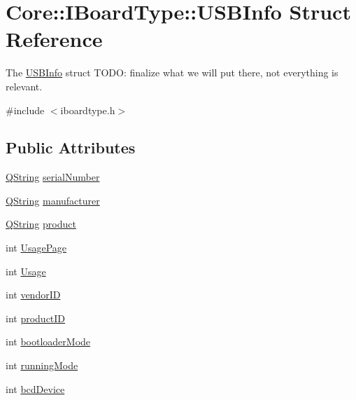 \hypertarget{struct_core_1_1_i_board_type_1_1_u_s_b_info}{\section{\-Core\-:\-:\-I\-Board\-Type\-:\-:\-U\-S\-B\-Info \-Struct \-Reference}
\label{struct_core_1_1_i_board_type_1_1_u_s_b_info}
}


\-The \hyperlink{struct_core_1_1_i_board_type_1_1_u_s_b_info}{\-U\-S\-B\-Info} struct \-T\-O\-D\-O\-: finalize what we will put there, not everything is relevant.  




{\ttfamily \#include $<$iboardtype.\-h$>$}

\subsection*{\-Public \-Attributes}
\begin{DoxyCompactItemize}
\item 
\hyperlink{group___u_a_v_objects_plugin_gab9d252f49c333c94a72f97ce3105a32d}{\-Q\-String} \hyperlink{group___core_plugin_ga895802cf9e1054b0fbffdc0fc3ff9f30}{serial\-Number}
\item 
\hyperlink{group___u_a_v_objects_plugin_gab9d252f49c333c94a72f97ce3105a32d}{\-Q\-String} \hyperlink{group___core_plugin_gab425397b209f59d9c9cb215481f4e018}{manufacturer}
\item 
\hyperlink{group___u_a_v_objects_plugin_gab9d252f49c333c94a72f97ce3105a32d}{\-Q\-String} \hyperlink{group___core_plugin_ga5e622955d0d8c0244266ab1702000d92}{product}
\item 
int \hyperlink{group___core_plugin_gabcd3cddf005c60e8f45ea04eaa929ae3}{\-Usage\-Page}
\item 
int \hyperlink{group___core_plugin_gae9b3ee9d3f84e2dc3c25cb6f90a248ad}{\-Usage}
\item 
int \hyperlink{group___core_plugin_gaa22fe6fa3154cfff62d3e1860c8b7f7b}{vendor\-I\-D}
\item 
int \hyperlink{group___core_plugin_ga454be60cf2bba54712173af606a748b8}{product\-I\-D}
\item 
int \hyperlink{group___core_plugin_ga18f0e8647d887f9f5e37b406c5bd6976}{bootloader\-Mode}
\item 
int \hyperlink{group___core_plugin_ga8e598df3f5e0f673451cbaf22bcd71d7}{running\-Mode}
\item 
int \hyperlink{group___core_plugin_ga874a6af25c4e960a94c79e02c29a8b40}{bcd\-Device}
\end{DoxyCompactItemize}


